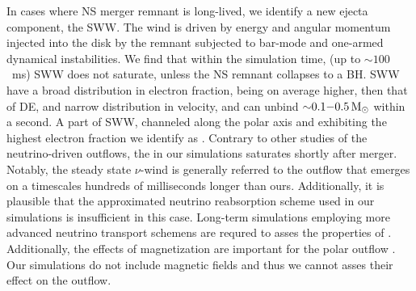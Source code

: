 In cases where \ac{NS} merger remnant is long-lived, we identify a new ejecta component, 
the \ac{SWW}. The wind is driven by energy and angular momentum injected into the 
disk by the remnant subjected to bar-mode and one-armed dynamical instabilities.
We find that within the simulation time, (up to ${\sim}100$~ms) \ac{SWW} does not 
saturate, unless the \ac{NS} remnant collapses to a \ac{BH}.
\ac{SWW} have a broad distribution in electron fraction, being on average higher,
then that of \ac{DE}, and narrow distribution in velocity, and can unbind
${\sim}0.1{-}0.5\, {\text{M}_{\odot}}$ within a second.
A part of \ac{SWW}, channeled along the polar axis and exhibiting the highest
electron fraction we identify as \nwind{}. Contrary to other studies of the 
neutrino-driven outflows, \citep[\eg][]{Dessart:2008zd,Perego:2014fma,Fujibayashi:2020dvr}
the \nwind{} in our simulations saturates shortly after merger.
%
Notably, the steady state $\nu$-wind is generally referred to the outflow 
that emerges on a timescales hundreds of milliseconds longer than ours. 
Additionally, it is plausible that the approximated neutrino reabsorption 
scheme used in our simulations is insufficient in this case. 
Long-term simulations employing more advanced 
neutrino transport schemens are requred to asses the properties of \nwind.
%
Additionally, the effects of magnetization are important for the polar outflow 
\citep{Siegel:2017nub,Metzger:2018uni,Fernandez:2018kax,Miller:2019dpt,Mosta:2020hlh}.
Our simulations do not include magnetic fields and thus we cannot asses their 
effect on the outflow.


